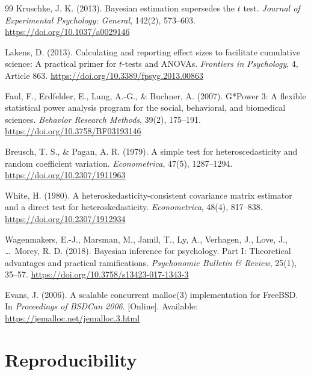 \documentclass[10pt,twocolumn,a4paper]{article}
\theoremstyle{definition}
\theoremstyle{plain}
\begin{document}
\begin{thebibliography}{99}
Kruschke, J. K. (2013).
\newblock Bayesian estimation supersedes the $t$ test.
\newblock \textit{Journal of Experimental Psychology: General}, 142(2), 573--603. \url{https://doi.org/10.1037/a0029146}

Lakens, D. (2013).
\newblock Calculating and reporting effect sizes to facilitate cumulative science: A practical primer for $t$-tests and ANOVAs.
\newblock \textit{Frontiers in Psychology}, 4, Article 863. \url{https://doi.org/10.3389/fpsyg.2013.00863}

Faul, F., Erdfelder, E., Lang, A.-G., \& Buchner, A. (2007).
\newblock G*Power 3: A flexible statistical power analysis program for the social, behavioral, and biomedical sciences.
\newblock \textit{Behavior Research Methods}, 39(2), 175--191. \url{https://doi.org/10.3758/BF03193146}

Breusch, T. S., \& Pagan, A. R. (1979).
\newblock A simple test for heteroscedasticity and random coefficient variation.
\newblock \textit{Econometrica}, 47(5), 1287--1294. \url{https://doi.org/10.2307/1911963}

White, H. (1980).
\newblock A heteroskedasticity-consistent covariance matrix estimator and a direct test for heteroskedasticity.
\newblock \textit{Econometrica}, 48(4), 817--838. \url{https://doi.org/10.2307/1912934}

Wagenmakers, E.-J., Marsman, M., Jamil, T., Ly, A., Verhagen, J., Love, J., \ldots\ Morey, R. D. (2018).
\newblock Bayesian inference for psychology. Part I: Theoretical advantages and practical ramifications.
\newblock \textit{Psychonomic Bulletin \& Review}, 25(1), 35--57. \url{https://doi.org/10.3758/s13423-017-1343-3}

Evans, J. (2006).
\newblock A scalable concurrent malloc(3) implementation for FreeBSD.
\newblock In \textit{Proceedings of BSDCan 2006}. [Online]. Available: \url{https://jemalloc.net/jemalloc.3.html}

\end{thebibliography}

\appendix

\section{Reproducibility}
\label{app:reproducibility}
\end{document}
